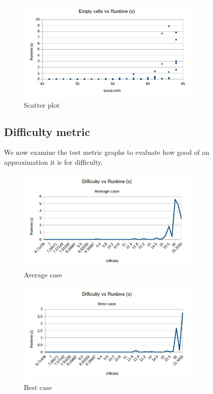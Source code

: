 \documentclass{article}
\begin{document}
\begin{figure}[H]
	\includegraphics[width=0.9\linewidth, height=5cm]{graphs_outputs/EmptycellsVSTimeScatter.jpg}
	\caption{Scatter plot}
\end{figure}

\newpage

\subsection{Difficulty metric}
We now examine the test metric graphs to evaluate how good of an approximation it is for difficulty.

\begin{figure}[H]
	\includegraphics[width=0.9\linewidth, height=5cm]{graphs_outputs/DifficultyVSTimeAverage.jpg}
	\caption{Average case}
\end{figure}

\begin{figure}[H]
	\includegraphics[width=0.9\linewidth, height=5cm]{graphs_outputs/DifficultyVSTimeBest.jpg}
	\caption{Best case}
\end{figure}
\end{document}
